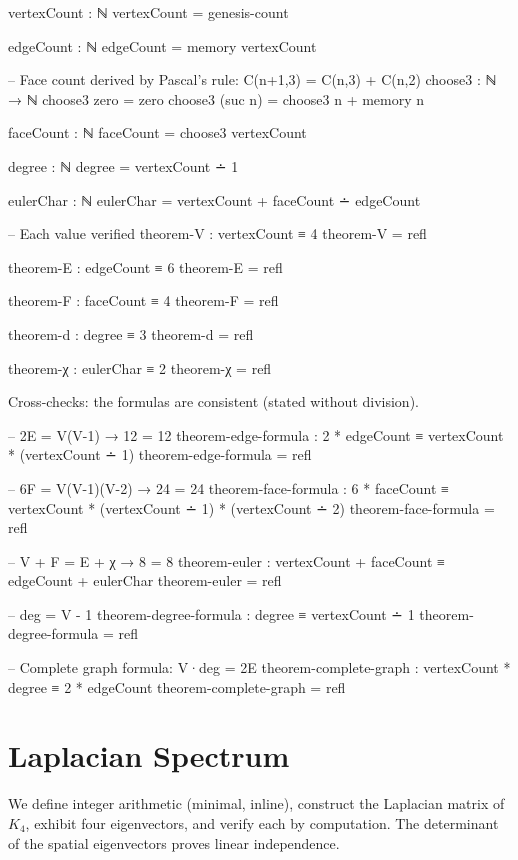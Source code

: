 \documentclass[11pt,a4paper]{article}
\begin{document}
\begin{code}
vertexCount : ℕ
vertexCount = genesis-count

edgeCount : ℕ
edgeCount = memory vertexCount

-- Face count derived by Pascal's rule: C(n+1,3) = C(n,3) + C(n,2)
choose3 : ℕ → ℕ
choose3 zero    = zero
choose3 (suc n) = choose3 n + memory n

faceCount : ℕ
faceCount = choose3 vertexCount

degree : ℕ
degree = vertexCount ∸ 1

eulerChar : ℕ
eulerChar = vertexCount + faceCount ∸ edgeCount

-- Each value verified
theorem-V : vertexCount ≡ 4
theorem-V = refl

theorem-E : edgeCount ≡ 6
theorem-E = refl

theorem-F : faceCount ≡ 4
theorem-F = refl

theorem-d : degree ≡ 3
theorem-d = refl

theorem-χ : eulerChar ≡ 2
theorem-χ = refl
\end{code}

Cross-checks: the formulas are consistent (stated without division).

\begin{code}
-- 2E = V(V-1)  →  12 = 12
theorem-edge-formula : 2 * edgeCount ≡ vertexCount * (vertexCount ∸ 1)
theorem-edge-formula = refl

-- 6F = V(V-1)(V-2)  →  24 = 24
theorem-face-formula : 6 * faceCount ≡ vertexCount * (vertexCount ∸ 1) * (vertexCount ∸ 2)
theorem-face-formula = refl

-- V + F = E + χ  →  8 = 8
theorem-euler : vertexCount + faceCount ≡ edgeCount + eulerChar
theorem-euler = refl

-- deg = V - 1
theorem-degree-formula : degree ≡ vertexCount ∸ 1
theorem-degree-formula = refl

-- Complete graph formula: V·deg = 2E
theorem-complete-graph : vertexCount * degree ≡ 2 * edgeCount
theorem-complete-graph = refl
\end{code}

\section{Laplacian Spectrum}
\label{sec:spectral}

We define integer arithmetic (minimal, inline), construct the Laplacian
matrix of $K_4$, exhibit four eigenvectors, and verify each by
computation. The determinant of the spatial eigenvectors proves
linear independence.
\end{document}
